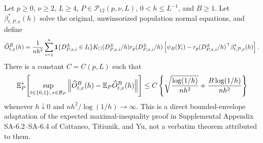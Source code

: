 Let \(p\geq0\), \(\nu\geq2\), \(L\geq4\), \(P\in\mathcal P_{12}(p,\nu,L)\), \(0<h\leq L^{-1}\), and \(B\geq1\).  Let \(\beta^*_{t,P,x}(h)\) solve the original, unwinsorized population normal equations, and define
\[
 \widehat O^B_{t,x}(h)={1\over nh^2}\sum_{i=1}^n
 \mathbf1\{D^{\pm}_{P,x,i}\in I_t\}K_\square(D^{\pm}_{P,x,i}/h)
 r_p(D^{\pm}_{P,x,i}/h)
 \left[\psi_B(Y_i)-r_p(D^{\pm}_{P,x,i}/h)^\top\beta^*_{t,P,x}(h)\right].
\]
There is a constant \(C=C(p,L)\) such that
\[
 \mathbb E_P^*\!\left[
 \sup_{t\in\{0,1\},\,x\in\mathcal B_P}
 \left\|\widehat O^B_{t,x}(h)-\mathbb E_P\widehat O^B_{t,x}(h)\right\|
 \right]
 \leq C\left\{
 \sqrt{{\log(1/h)\over nh^2}}+{B\log(1/h)\over nh^2}
 \right\}
\]
whenever \(h\downarrow0\) and \(nh^2/\log(1/h)\to\infty\).  This is a direct bounded-envelope adaptation of the expected maximal-inequality proof in Supplemental Appendix SA-6.2--SA-6.4 of Cattaneo, Titiunik, and Yu, not a verbatim theorem attributed to them.